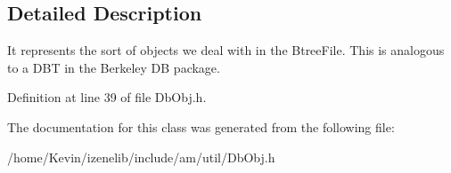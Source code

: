 \subsection{Detailed Description}
It represents the sort of objects we deal with in the BtreeFile. This is analogous to a DBT in the Berkeley DB package. 

Definition at line 39 of file DbObj.h.

The documentation for this class was generated from the following file:\begin{CompactItemize}
\item 
/home/Kevin/izenelib/include/am/util/DbObj.h\end{CompactItemize}
